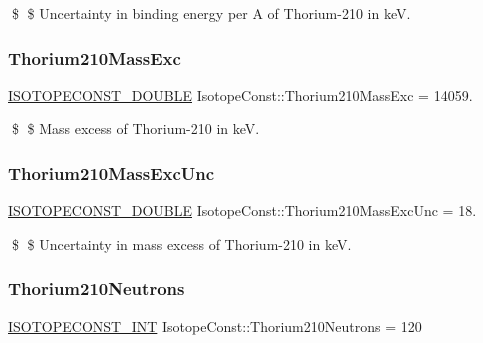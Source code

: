 \$ \$ Uncertainty in binding energy per A of Thorium-\/210 in keV. \mbox{\label{group___isotope_const-_thorium-_th210_ga6da0a66ad83f928f3c594881b87661e6}} 
\subsubsection{\texorpdfstring{Thorium210\+Mass\+Exc}{Thorium210MassExc}}
{\footnotesize\ttfamily \mbox{\hyperlink{group___isotope_const-_macros_ga8f45a7272ce02c0b4c65c44636ed719a}{I\+S\+O\+T\+O\+P\+E\+C\+O\+N\+S\+T\+\_\+\+D\+O\+U\+B\+LE}} Isotope\+Const\+::\+Thorium210\+Mass\+Exc = 14059.}

\$ \$ Mass excess of Thorium-\/210 in keV. \mbox{\label{group___isotope_const-_thorium-_th210_ga469afeeb87b3da3afee096322dd6137b}} 
\subsubsection{\texorpdfstring{Thorium210\+Mass\+Exc\+Unc}{Thorium210MassExcUnc}}
{\footnotesize\ttfamily \mbox{\hyperlink{group___isotope_const-_macros_ga8f45a7272ce02c0b4c65c44636ed719a}{I\+S\+O\+T\+O\+P\+E\+C\+O\+N\+S\+T\+\_\+\+D\+O\+U\+B\+LE}} Isotope\+Const\+::\+Thorium210\+Mass\+Exc\+Unc = 18.}

\$ \$ Uncertainty in mass excess of Thorium-\/210 in keV. \mbox{\label{group___isotope_const-_thorium-_th210_gae43ef2778b70a9520348b3f696f70a6d}} 
\subsubsection{\texorpdfstring{Thorium210\+Neutrons}{Thorium210Neutrons}}
{\footnotesize\ttfamily \mbox{\hyperlink{group___isotope_const-_macros_ga5f18360b3e99483a35c32d789e62621c}{I\+S\+O\+T\+O\+P\+E\+C\+O\+N\+S\+T\+\_\+\+I\+NT}} Isotope\+Const\+::\+Thorium210\+Neutrons = 120}

